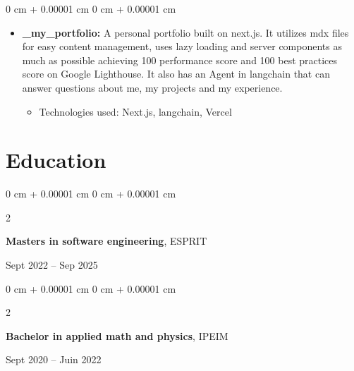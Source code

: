 \documentclass[10pt, letterpaper]{article}
\newenvironment{highlights}{
  \begin{itemize}[
    topsep=0.10 cm,
    parsep=0.10 cm,
    partopsep=0pt,
    itemsep=0pt,
    leftmargin=0 cm + 10pt
    ]
  }{
\end{itemize}
}
\newenvironment{highlightsforbulletentries}{
  \begin{itemize}[
    topsep=0.10 cm,
    parsep=0.10 cm,
    partopsep=0pt,
    itemsep=0pt,
    leftmargin=10pt
    ]
  }{
\end{itemize}
} %
\newenvironment{onecolentry}{
  \begin{adjustwidth}{
      0 cm + 0.00001 cm
    }{
      0 cm + 0.00001 cm
    }
  }{
  \end{adjustwidth}
} %
\newenvironment{twocolentry}[2][]{
  \onecolentry
  \def\secondColumn{#2}
  \setcolumnwidth{\fill, 4.5 cm}
  \begin{paracol}{2}
  }{
    \switchcolumn \raggedleft \secondColumn
  \end{paracol}
  \end{onecolentry}
} %
\begin{document}
    \begin{onecolentry}
    \begin{highlights}
    \item \textbf{\_my\_portfolio: } A personal portfolio built on next.js. It utilizes mdx files for easy content management, uses lazy loading and server components as much as possible achieving 100 performance score and 100 best practices score on Google Lighthouse. It also has an Agent in langchain that can answer questions about me, my projects and my experience.

                \begin{highlightsforbulletentries}
    \item Technologies used: Next.js, langchain, Vercel
    \end{highlightsforbulletentries}

    \end{highlights}
  \end{onecolentry}





  \section{Education}




  \begin{twocolentry}{
      Sept 2022 – Sep 2025
    }
    \textbf{Masters in software engineering}, ESPRIT
  \end{twocolentry}

  \vspace{0.10 cm}

  \begin{twocolentry}{
      Sept 2020 – Juin 2022
    }
    \textbf{Bachelor in applied math and physics}, IPEIM
  \end{twocolentry}




  
\end{document}
